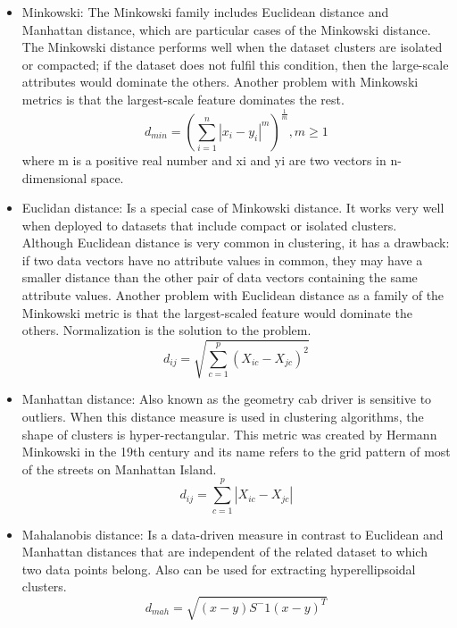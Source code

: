 \begin{itemize}
  \item Minkowski: The Minkowski family includes Euclidean distance and Manhattan distance, which are particular cases of the Minkowski distance. The Minkowski distance performs well when the dataset clusters
are isolated or compacted; if the dataset does not fulfil this condition, then the large-scale attributes would dominate the others. Another problem with Minkowski metrics is that the largest-scale feature dominates the rest.
    \begin{equation}
        d_{min} = (\sum_{i=1}^{n}|x_i - y_i|^m)^\frac{1}{m}, m\geq 1
    \end{equation}
    where m is a positive real number and xi and yi are two vectors in n-dimensional space.
    \item Euclidan distance: Is a special case of Minkowski distance. It works very well when deployed to datasets that include compact or isolated clusters. Although Euclidean distance is very common in clustering, it has a drawback: if two data vectors have no attribute values in common, they may have a smaller distance than the other pair of data vectors containing the same attribute values. Another problem with Euclidean distance as a family of the Minkowski metric is that the largest-scaled feature would dominate the others. Normalization is the solution to the problem.
    \begin{equation}
        d_{ij} =  \sqrt{\sum_{c=1}^{p}(X_{ic}-X_{jc})^2}
    \end{equation}
     \item Manhattan distance: Also known as the geometry cab driver is sensitive to outliers. When this distance measure is used in clustering algorithms, the shape of clusters is hyper-rectangular. This metric was created by Hermann Minkowski
in the 19th century and its name refers to the grid pattern of most of the streets on Manhattan Island.
     \begin{equation}
        d_{ij} =  \sum_{c=1}^{p}|X_{ic}-X_{jc}|
    \end{equation}
    \item Mahalanobis distance: Is a data-driven measure in contrast to Euclidean and Manhattan distances that are independent of the related dataset to which two data points belong. Also can be used for extracting hyperellipsoidal clusters.
    \begin{equation}
        d_{mah}= \sqrt{(x-y)S^-1(x-y)^T}
    \end{equation}

\end{itemize}
